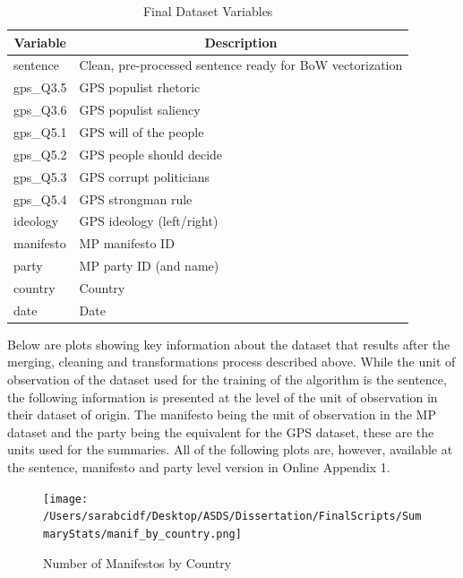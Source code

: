 \documentclass[12pt,letterpaper]{article}
\begin{document}
\begin{table}[H]
	\centering
	\caption{Final Dataset Variables}
	\begin{tabular}{|l|l|}
		\hline
		\multicolumn{1}{|c|}{\textbf{Variable}} & \multicolumn{1}{c|}{\textbf{Description}} \\ \hline
		sentence          & Clean, pre-processed sentence ready for BoW vectorization \\
		gps\_Q3.5         & GPS populist rhetoric                             \\
		gps\_Q3.6         & GPS populist saliency                             \\
		gps\_Q5.1         & GPS will of the people                            \\
		gps\_Q5.2         & GPS people should decide                          \\
		gps\_Q5.3         & GPS corrupt politicians                           \\
		gps\_Q5.4         & GPS strongman rule                                \\
		ideology          & GPS ideology (left/right)                         \\
		manifesto         & MP manifesto ID                                   \\
		party             & MP party ID (and name)                            \\
		country           & Country                                           \\
		date              & Date                                              \\ \hline
	\end{tabular}
	\label{tab:variables_description}
\end{table}

\noindent Below are plots showing key information about the dataset that results after the merging, cleaning and transformations process described above. While the unit of observation of the dataset used for the training of the algorithm is the sentence, the following information is presented at the level of the unit of observation in their dataset of origin. The manifesto being the unit of observation in the MP dataset and the party being the equivalent for the GPS dataset, these are the units used for the summaries. All of the following plots are, however, available at the sentence, manifesto and party level version in Online Appendix 1. 

\begin{figure}[H]
	\centering
	\caption{Number of Manifestos by Country}
	\label{fig:yourfigure}
	\texttt{[image: /Users/sarabcidf/Desktop/ASDS/Dissertation/FinalScripts/SummaryStats/manif\_by\_country.png]} 
\end{figure}
\end{document}
